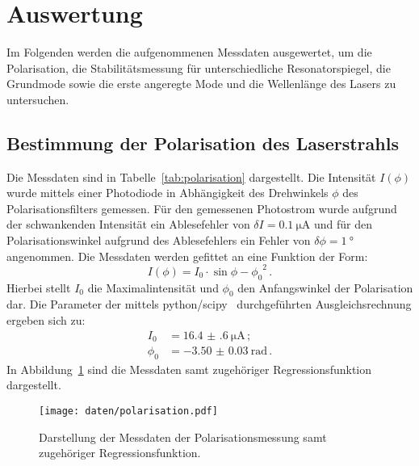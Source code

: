\section{Auswertung}
\label{sec:Auswertung}
Im Folgenden werden die aufgenommenen Messdaten ausgewertet, um die Polarisation, die Stabilitätsmessung für unterschiedliche Resonatorspiegel, die Grundmode sowie die erste angeregte Mode und die Wellenlänge des Lasers
zu untersuchen.
\subsection{Bestimmung der Polarisation des Laserstrahls}
Die Messdaten sind in Tabelle~\ref{tab:polarisation} dargestellt. Die Intensität $I(\phi)$ wurde mittels einer Photodiode in Abhängigkeit des Drehwinkels $\phi$ des Polarisationsfilters gemessen. Für den gemessenen Photostrom wurde aufgrund der schwankenden Intensität ein Ablesefehler von $\delta I=\SI{0.1}{\micro\ampere}$ und für den Polarisationswinkel aufgrund des Ablesefehlers ein Fehler von $\delta \phi=\SI{1}{\degree}$ angenommen.
Die Messdaten werden gefittet an eine Funktion der Form:
\begin{equation}
    I(\phi)=I_0\cdot \sin{\phi-\phi_0}^2 \,\text{.}
\end{equation}
Hierbei stellt $I_0$ die Maximalintensität und $\phi_0$ den Anfangswinkel der Polarisation dar.
Die Parameter der mittels python/scipy~\cite{scipy} durchgeführten Ausgleichsrechnung ergeben sich zu:
\begin{align}
  I_0&=\SI{16.4(6)}{\micro\ampere}\,\text {;}\\ \phi_0&=\SI{-3.50(3)}{\radian}\,\text{.}
\end{align}
In Abbildung~\ref{fig:polarisation} sind die Messdaten samt zugehöriger Regressionsfunktion dargestellt.
\begin{figure}
  \centering
  \texttt{[image: daten/polarisation.pdf]}
  \caption{Darstellung der Messdaten der Polarisationsmessung samt zugehöriger Regressionsfunktion.}
  \label{fig:polarisation}
\end{figure}

